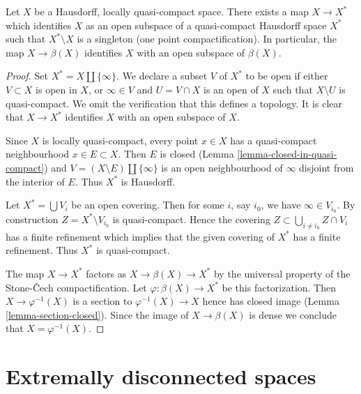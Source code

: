 \begin{lemma}
\label{lemma-one-point-compactification}
Let $X$ be a Hausdorff, locally quasi-compact space.
There exists a map $X \to X^*$ which identifies $X$ as an open
subspace of a quasi-compact Hausdorff space $X^*$ such that
$X^* \setminus X$ is a singleton (one point compactification).
In particular, the map $X \to \beta(X)$ identifies $X$
with an open subspace of $\beta(X)$.
\end{lemma}

\begin{proof}
Set $X^* = X \amalg \{\infty\}$. We declare a subset $V$ of $X^*$ to be
open if either $V \subset X$ is open in $X$, or $\infty \in V$ and
$U = V \cap X$ is an open of $X$ such that $X \setminus U$ is quasi-compact.
We omit the verification that this defines a topology. It is clear
that $X \to X^*$ identifies $X$ with an open subspace of $X$.

\medskip\noindent
Since $X$ is locally quasi-compact, every point $x \in X$ has a
quasi-compact neighbourhood $x \in E \subset X$. Then $E$
is closed (Lemma \ref{lemma-closed-in-quasi-compact}) and
$V = (X \setminus E) \amalg \{\infty\}$ is an open neighbourhood
of $\infty$ disjoint from the interior of $E$. Thus $X^*$ is Hausdorff.

\medskip\noindent
Let $X^* = \bigcup V_i$ be an open covering. Then for some $i$, say $i_0$,
we have $\infty \in V_{i_0}$. By construction $Z = X^* \setminus V_{i_0}$
is quasi-compact. Hence the covering
$Z \subset \bigcup_{i \not = i_0} Z \cap V_i$ has a finite refinement which
implies that the given covering of $X^*$ has a finite refinement.
Thus $X^*$ is quasi-compact.

\medskip\noindent
The map $X \to X^*$ factors as $X \to \beta(X) \to X^*$ by the universal
property of the Stone-{\v C}ech compactification. Let
$\varphi : \beta(X) \to X^*$ be this factorization.
Then $X \to \varphi^{-1}(X)$ is a section to
$\varphi^{-1}(X) \to X$ hence has closed image
(Lemma \ref{lemma-section-closed}).
Since the image of $X \to \beta(X)$ is dense we conclude that
$X = \varphi^{-1}(X)$.
\end{proof}










\section{Extremally disconnected spaces}
\label{section-extremally-disconnected}


